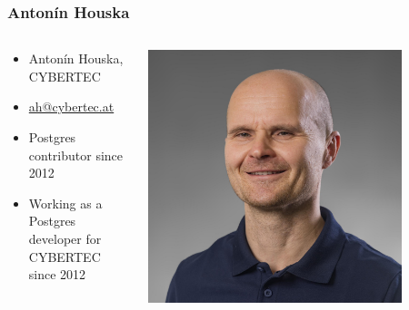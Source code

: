 \newcommand{\linksize}{\scriptsize}


\begin{frame}[plain]
  \titlepage
\end{frame}

\begin{frame}
  \frametitle{Antonín Houska}

  \begin{columns}[T]
    \begin{column}{0.8\textwidth}
      \begin{itemize}
	\item Antonín Houska, CYBERTEC
	\item \href{mailto:ah@cybertec.at}{ah@cybertec.at}
	\item Postgres contributor since 2012
	\item Working as a Postgres developer for CYBERTEC since 2012
      \end{itemize}
    \end{column}
    \begin{column}{0.2\textwidth}
      \includegraphics[width=0.8\textwidth]{Antonin-Houska-faceshot.jpg}
    \end{column}
  \end{columns}
\end{frame}

